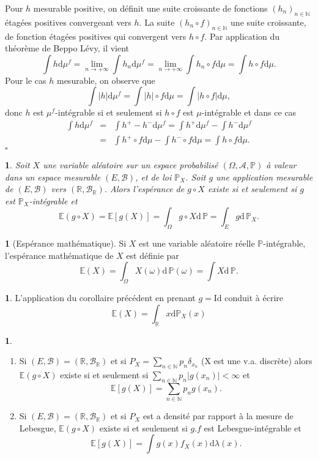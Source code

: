 \documentclass[8pt,notheorems]{beamer}
\def \E{\mathbb E}
\def \N{\mathbb N}
\def \R{\mathbb{R}}
\def \P {\mathbb P}
\newtheorem{corollary}{\translate{Corollaire}}
\theoremstyle{definition}
\newtheorem{definition}{\translate{Definition}}
\theoremstyle{example}
\newtheorem{example}{\translate{Exemple}}
\newtheorem{remark}{\translate{Remarque}}
\theoremstyle{mystyle}
\theoremstyle{plain}
\begin{document}
\begin{frame}[allowframebreaks]
 Pour $h$ mesurable positive, on définit une suite croissante de fonctions $(h_n)_{n\in\N}$ étagées positives convergeant vers $h$. La suite $(h_n\circ f)_{n\in\N}$ une suite croissante, de fonction étagées positives qui convergent vers $h\circ f$. Par application du théorème de Beppo Lévy, il vient
$$
\int h\text{d}\mu^{f}=\underset{n\rightarrow +\infty}{\lim}\int h_{n}\text{d}\mu^{f}=\underset{n\rightarrow +\infty}{\lim}\int h_{n}\circ f\text{d}\mu=\int h\circ f\text{d}\mu.
$$
Pour le cas $h$ mesurable, on observe que
$$
\int |h|\text{d}\mu^{f}=\int |h|\circ f\text{d}\mu=\int |h\circ f|\text{d}\mu,
$$
donc $h$ est $\mu^{f}$-intégrable si et seulement si $h\circ f$ est $\mu$-intégrable et dans ce cas
\begin{eqnarray*}
\int h\text{d}\mu^{f}&=&\int h^{+}-h^{-}\text{d}\mu^{f}=\int h^{+}\text{d}\mu^{f}-\int h^{-}\text{d}\mu^{f}\\
&=&\int h^{+}\circ f\text{d}\mu-\int h^{-}\circ f\text{d}\mu=\int h\circ f\text{d}\mu.
\end{eqnarray*}
$\square$\\
\end{frame}
\begin{frame}[allowframebreaks]
\begin{corollary}
Soit $X$ une variable aléatoire sur un espace probabilisé  $(\Omega,\mathcal{A},\P)$ à valeur dans un espace mesurable $(E, \mathcal{B})$, et de loi $\P_X$. Soit $g$ une application mesurable de $(E,\mathcal{B})$ vers $(\R,\mathcal{B}_\R)$. Alors l'espérance de $g\circ X$ existe si et seulement si $g$ est $\P_X$-intégrable et 
$$
\E\left(g\circ X\right) = \E\left[g(X )\right]= \int_\Omega g\circ X\text{d}\,\P = \int_E g\text{d}\,\P_X.
$$
\end{corollary}
\begin{definition}[Espérance mathématique]
Si $X$ est une variable aléatoire réelle $\P$-intégrable, l'espérance mathématique de $X$ est définie par 
$$
\E(X) = \int_{\Omega} X(\omega)\text{d}\,\P(\omega) = \int X\text{d}\,\P.
$$
\end{definition}
\begin{remark}
L'application du corollaire précédent en prenant $g = \text{Id}$ conduit à écrire 
$$
\E(X) = \int_\R x \text{d}\P_X(x)
$$
\end{remark}
\begin{example}
    \begin{enumerate}
        \item Si $(E,\mathcal{B}) = (\R,\mathcal{B}_{\R})$ et si $P_X = \sum_{n\in \N} p_n\delta_{x_n} $ (X est une v.a. discrète) alors $\E(g\circ X)$ existe si et seulement si $\sum_{n\in \N}p_n|g(x_n)|<\infty$ et 
        $$
        \E[g(X)] = \sum_{n\in \N}p_ng(x_n).
        $$
        \item Si $(E,\mathcal{B}) = (\R,\mathcal{B}_{\R})$ et si $P_X$ est a densité par rapport à la mesure de Lebesgue, $\E(g\circ X)$ existe si et seulement si $g.f$ est Lebesgue-intégrable et 
        $$
        \E[g(X)] = \int g(x)f_X(x)\text{d}\lambda(x).
        $$ 
    \end{enumerate}
\end{example}
\end{frame}
\end{document}
